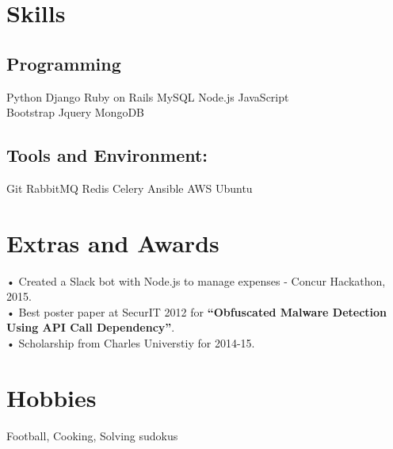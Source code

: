 \documentclass[]{deedy-resume-openfont}
\begin{document}
\begin{minipage}[t]{0.33\textwidth}
\section{Skills}
\subsection{Programming}
Python \textbullet{} Django \textbullet{} Ruby on Rails \textbullet{} MySQL \textbullet{} Node.js \textbullet{} JavaScript \\
Bootstrap \textbullet{} Jquery \textbullet{} MongoDB  \\
\subsection{Tools and Environment:}
Git \textbullet{} RabbitMQ \textbullet{} Redis \textbullet{} Celery \textbullet{}  Ansible \textbullet{} AWS \textbullet{} Ubuntu\\
\sectionsep


\section{Extras and Awards}
• Created a Slack bot with Node.js to manage expenses - Concur Hackathon, 2015. \\
• Best poster paper at SecurIT 2012 for \textbf{“Obfuscated Malware Detection Using API Call Dependency”}. \\
• Scholarship from Charles Universtiy for 2014-15. \\
\sectionsep


\section{Hobbies}
Football, Cooking, Solving sudokus
\sectionsep

%
%

\end{minipage}
\hfill
\end{document}
